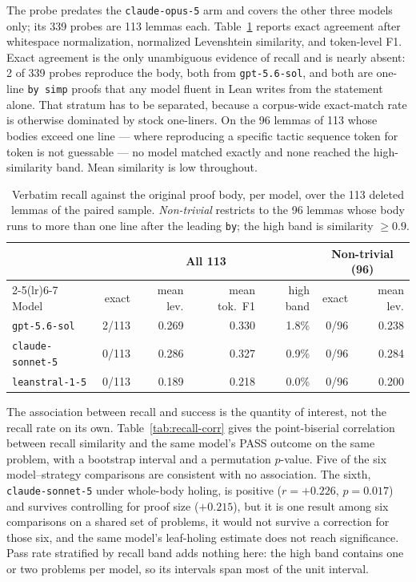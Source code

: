 \documentclass{article}
\begin{document}
The probe predates the \texttt{claude-opus-5} arm and covers the other three models only;
its 339 probes are 113 lemmas each.
Table~\ref{tab:recall-scores} reports exact agreement after whitespace normalization,
normalized Levenshtein similarity, and token-level F1. Exact agreement is the only
unambiguous evidence of recall and is nearly absent: 2 of 339 probes reproduce the body,
both from \texttt{gpt-5.6-sol}, and both are one-line \texttt{by simp} proofs that any model
fluent in Lean writes from the statement alone. That stratum has to be separated, because a
corpus-wide exact-match rate is otherwise dominated by stock one-liners. On the 96 lemmas of
113 whose bodies exceed one line --- where reproducing a specific tactic sequence token for
token is not guessable --- no model matched exactly and none reached the high-similarity
band. Mean similarity is low throughout.

\begin{table}[h]
  \caption{Verbatim recall against the original proof body, per model, over the 113 deleted
  lemmas of the paired sample. \emph{Non-trivial} restricts to the 96 lemmas whose body runs
  to more than one line after the leading \texttt{by}; the high band is similarity
  $\geq 0.9$.}
  \label{tab:recall-scores}
  \centering
  \small
  \begin{tabular}{lrrrrrr}
    \toprule
    & \multicolumn{4}{c}{All 113} & \multicolumn{2}{c}{Non-trivial (96)} \\
    \cmidrule(lr){2-5}\cmidrule(lr){6-7}
    Model & exact & mean lev. & mean tok.\ F1 & high band & exact & mean lev. \\
    \midrule
    \texttt{gpt-5.6-sol}     & 2/113 & 0.269 & 0.330 & 1.8\% & 0/96 & 0.238 \\
    \texttt{claude-sonnet-5} & 0/113 & 0.286 & 0.327 & 0.9\% & 0/96 & 0.284 \\
    \texttt{leanstral-1-5}   & 0/113 & 0.189 & 0.218 & 0.0\% & 0/96 & 0.200 \\
    \bottomrule
  \end{tabular}
\end{table}

The association between recall and success is the quantity of interest, not the recall rate
on its own. Table~\ref{tab:recall-corr} gives the point-biserial correlation between recall
similarity and the same model's PASS outcome on the same problem, with a bootstrap interval
and a permutation $p$-value. Five of the six model--strategy comparisons are consistent with
no association. The sixth, \texttt{claude-sonnet-5} under whole-body holing, is positive
($r = +0.226$, $p = 0.017$) and survives controlling for proof size ($+0.215$), but it is one
result among six comparisons on a shared set of problems, it would not survive a correction
for those six, and the same model's leaf-holing estimate does not reach significance. Pass rate stratified by recall band adds nothing here:
the high band contains one or two problems per model, so its intervals span most of the unit
interval.
\end{document}
